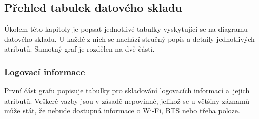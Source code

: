 \documentclass[thesis=M,czech]{FITthesis}[2012/06/26]
\begin{document}
\subsection{Přehled tabulek datového skladu}
Úkolem této kapitoly je popsat jednotlivé tabulky vyskytující se na diagramu datového skladu. U každé z nich se nachází stručný popis a detaily jednotlivých atributů. Samotný graf je rozdělen na dvě části.

\subsubsection*{Logovací informace}
První část grafu popisuje tabulky pro skladování logovacích informací a~jejich atributů. Veškeré vazby jsou v zásadě nepovinné, jelikož se u většiny záznamů může stát, že nebude dostupná informace o Wi-Fi, BTS nebo třeba poloze.
\end{document}
